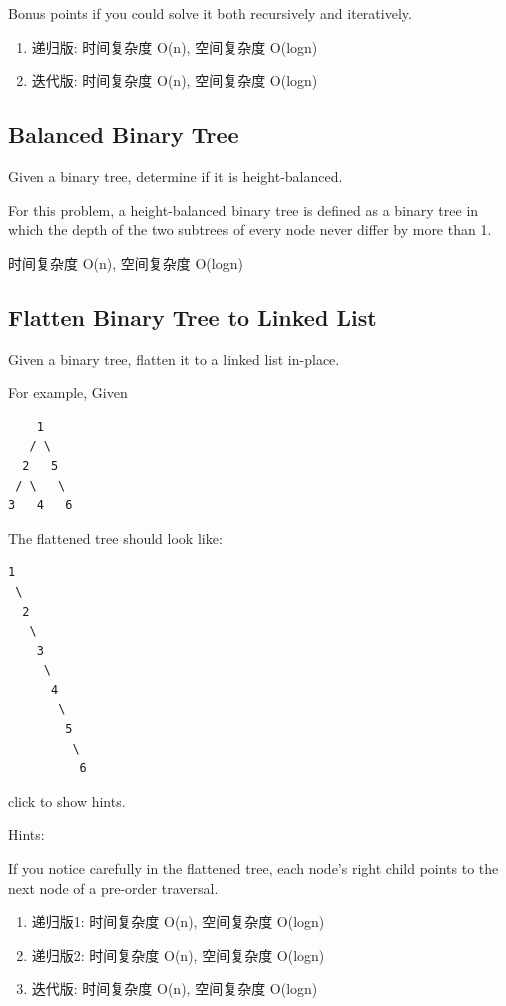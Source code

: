 \documentclass[12pt]{book}
\begin{document}
Bonus points if you could solve it both recursively and iteratively.
\begin{enumerate}
\item 递归版: 时间复杂度 O(n), 空间复杂度 O(logn)
\label{sec-4-2-9-1}
\item 迭代版: 时间复杂度 O(n), 空间复杂度 O(logn)
\label{sec-4-2-9-2}
\end{enumerate}


\subsection{Balanced Binary Tree}
\label{sec-4-2-10}
Given a binary tree, determine if it is height-balanced.

For this problem, a height-balanced binary tree is defined as a binary tree in which the depth of the two subtrees of every node never differ by more than 1.

时间复杂度 O(n), 空间复杂度 O(logn)

\subsection{Flatten Binary Tree to Linked List}
\label{sec-4-2-11}
Given a binary tree, flatten it to a linked list in-place.

For example, Given
\lstset{language=java,label= ,caption= ,numbers=none}
\begin{lstlisting}
    1
   / \
  2   5
 / \   \
3   4   6
\end{lstlisting}

The flattened tree should look like:
\lstset{language=java,label= ,caption= ,numbers=none}
\begin{lstlisting}
1
 \
  2
   \
    3
     \
      4
       \
        5
         \
          6
\end{lstlisting}
click to show hints.

Hints:

If you notice carefully in the flattened tree, each node's right child points to the next node of a pre-order traversal.
\begin{enumerate}
\item 递归版1: 时间复杂度 O(n), 空间复杂度 O(logn)
\label{sec-4-2-11-1}
\item 递归版2: 时间复杂度 O(n), 空间复杂度 O(logn)
\label{sec-4-2-11-2}
\item 迭代版: 时间复杂度 O(n), 空间复杂度 O(logn)
\label{sec-4-2-11-3}
\end{enumerate}
\end{document}

